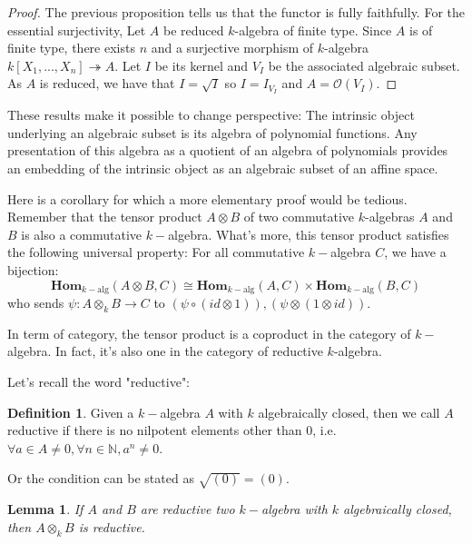 \documentclass[12pt,a4paper,english]{article}
\theoremstyle{plain}
\newtheorem{lem}[thm]{Lemma}
\theoremstyle{definition}
\newtheorem{defi}{Definition}
\theoremstyle{remark}
\newcommand{\homo}{\mathbf{Hom}}
\begin{document}
\begin{proof}
The previous proposition tells us that the functor is fully faithfully. For the essential surjectivity, Let $A$ be reduced $k$-algebra of finite type. Since $A$ is of finite type, there exists $n$ and a surjective morphism of $k$-algebra $k[X_{1},...,X_{n}]\twoheadrightarrow A$. Let $I$ be its kernel and $V_{I}$ be the associated algebraic subset. As $A$ is reduced, we have that $I=\sqrt{I}$ so $I=I_{V_{I}}$ and $A=\mathcal{O}(V_{I})$.
\end{proof}
These results make it possible to change perspective: The intrinsic object underlying an algebraic subset is its algebra of polynomial functions. Any presentation of this algebra as a quotient of an algebra of polynomials provides an embedding of the intrinsic object as an algebraic subset of an affine space.

Here is a corollary for which a more elementary proof would be tedious. Remember that the tensor product $A\otimes B$ of two commutative $k$-algebras $A$ and $B$ is also a commutative $k-$algebra. What's more, this tensor product satisfies the following universal property: For all commutative $k-$algebra $C$, we have a bijection:
\begin{equation*}
    \homo_{k-\text{alg}}(A\otimes B, C)\cong\homo_{k-\text{alg}}(A,C)\times\homo_{k-\text{alg}}(B,C)
\end{equation*}
who sends $\psi:A\otimes_{k}B\rightarrow C$ to $(\psi\circ(id\otimes1)),(\psi\otimes(1\otimes id))$.

In term of category, the tensor product is a coproduct in the category of $k-$algebra. In fact, it's also one in the category of reductive $k$-algebra.

Let's recall the word "reductive":
\begin{defi}
Given a $k-$algebra $A$ with $k$ algebraically closed, then we call $A$ reductive if there is no nilpotent elements other than 0, i.e. $\forall a\in A\not=0, \forall n\in\mathbb{N}, a^{n}\not=0$.

Or the condition can be stated as $\sqrt{(0)}=(0)$.
\end{defi}

\begin{lem}
If $A$ and $B$ are reductive two $k-$algebra with $k$ algebraically closed, then $A\otimes_{k} B$ is reductive.
\end{lem}
\end{document}

